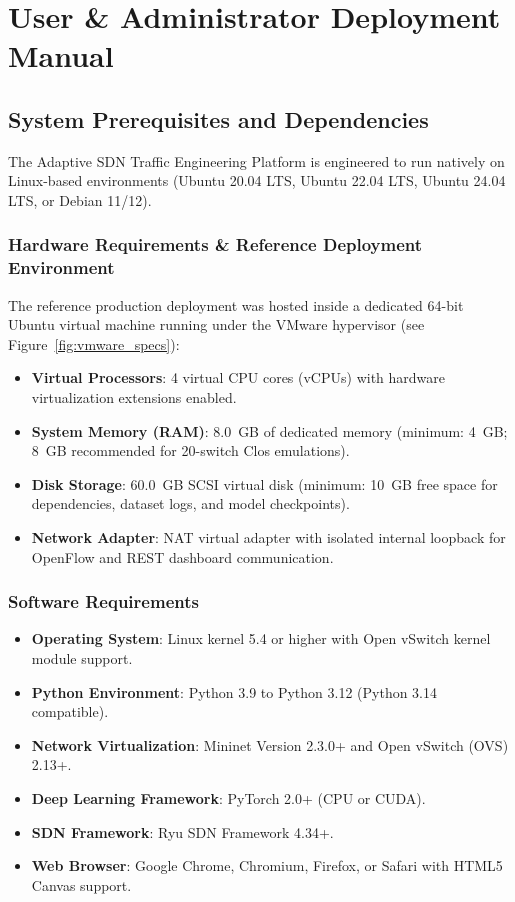 \chapter{User \& Administrator Deployment Manual}
\label{app:manual}

\section{System Prerequisites and Dependencies}
The Adaptive SDN Traffic Engineering Platform is engineered to run natively on Linux-based environments (Ubuntu 20.04 LTS, Ubuntu 22.04 LTS, Ubuntu 24.04 LTS, or Debian 11/12). 

\subsection{Hardware Requirements \& Reference Deployment Environment}
The reference production deployment was hosted inside a dedicated 64-bit Ubuntu virtual machine running under the VMware hypervisor (see Figure~\ref{fig:vmware_specs}):
\begin{itemize}
    \item \textbf{Virtual Processors}: 4 virtual CPU cores (vCPUs) with hardware virtualization extensions enabled.
    \item \textbf{System Memory (RAM)}: 8.0~GB of dedicated memory (minimum: 4~GB; 8~GB recommended for 20-switch Clos emulations).
    \item \textbf{Disk Storage}: 60.0~GB SCSI virtual disk (minimum: 10~GB free space for dependencies, dataset logs, and model checkpoints).
    \item \textbf{Network Adapter}: NAT virtual adapter with isolated internal loopback for OpenFlow and REST dashboard communication.
\end{itemize}


\subsection{Software Requirements}
\begin{itemize}
    \item \textbf{Operating System}: Linux kernel 5.4 or higher with Open vSwitch kernel module support.
    \item \textbf{Python Environment}: Python 3.9 to Python 3.12 (Python 3.14 compatible).
    \item \textbf{Network Virtualization}: Mininet Version 2.3.0+ and Open vSwitch (OVS) 2.13+.
    \item \textbf{Deep Learning Framework}: PyTorch 2.0+ (CPU or CUDA).
    \item \textbf{SDN Framework}: Ryu SDN Framework 4.34+.
    \item \textbf{Web Browser}: Google Chrome, Chromium, Firefox, or Safari with HTML5 Canvas support.
\end{itemize}

